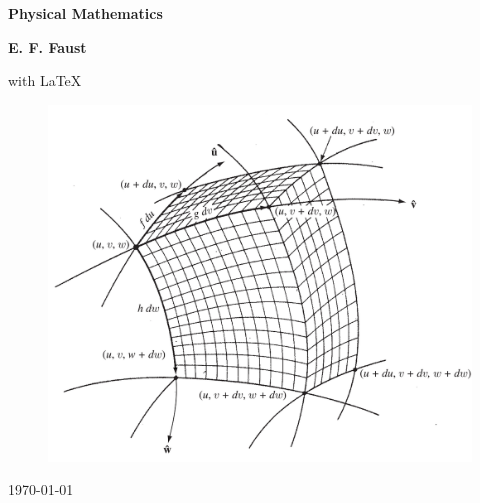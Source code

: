 \documentclass[../main.tex]{subfiles}
\begin{document}
\begin{center}
            
    \Huge
    \textbf{Physical Mathematics}

    \vspace{1.5cm}
    \Large
    \textbf{E. F. Faust} 

    \vspace{0.2cm}
    \large with \LaTeX
    \vfill
    \begin{figure}[h]
        \centering
        \includegraphics[width=\textwidth]{../Rss/CurveLinear.png}
    \end{figure}
    \vfill
    
    \Large
    {\today}

\end{center}
\end{document}

